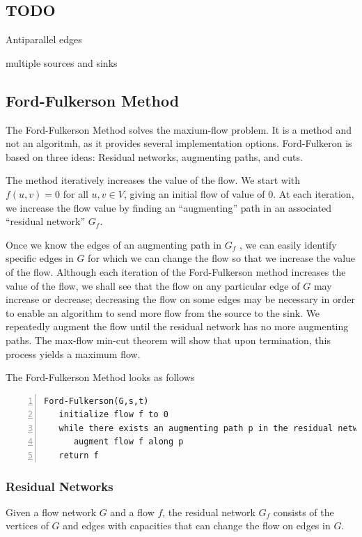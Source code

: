 \subsection{TODO}

Antiparallel edges

multiple sources and sinks

\subsection{Ford-Fulkerson Method}

The Ford-Fulkerson Method solves the maxium-flow problem. It is a method and not an algoritmh, as it provides several implementation options. Ford-Fulkeron is based on three ideas: Residual networks, augmenting paths, and cuts.

The method iteratively increases the value of the flow. We start with $f(u,v)=0$ for all $u,v \in V$, giving an initial flow of value of $0$. At each iteration, we increase the flow value by finding an ``augmenting'' path in an associated ``residual network'' $G_f$.

Once we know the edges of an augmenting path in $G_f$ , we can easily identify speciﬁc edges in $G$ for which we can change the ﬂow so that we increase the value of the ﬂow. Although each iteration of the Ford-Fulkerson method increases the value of the ﬂow, we shall see that the ﬂow on any particular edge of $G$ may increase or decrease; decreasing the ﬂow on some edges may be necessary in order to enable an algorithm to send more ﬂow from the source to the sink. We repeatedly augment the ﬂow until the residual network has no more augmenting paths. The max-ﬂow min-cut theorem will show that upon termination, this process yields a maximum ﬂow.

The Ford-Fulkerson Method looks as follows

\begin{Verbatim}[numbers=left, xleftmargin=5mm]
Ford-Fulkerson(G,s,t)
   initialize flow f to 0
   while there exists an augmenting path p in the residual network G_f
      augment flow f along p
   return f
\end{Verbatim}


\subsubsection{Residual Networks}

Given a flow network $G$ and a flow $f$, the residual network $G_f$ consists of the vertices of $G$ and edges with capacities that can change the flow on edges in $G$.

